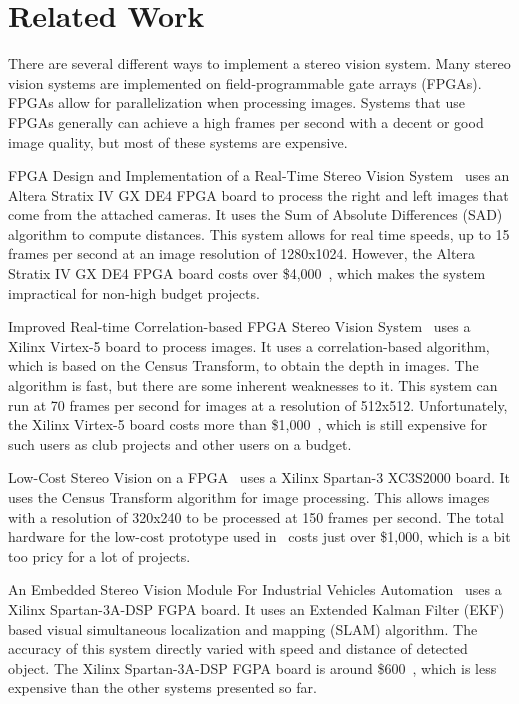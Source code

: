 \chapter{Related Work}

There are several different ways to implement a stereo vision system. Many stereo vision systems are implemented on field-programmable gate arrays (FPGAs). FPGAs allow for parallelization when processing images. Systems that use FPGAs generally can achieve a high frames per second with a decent or good image quality, but most of these systems are expensive. 

FPGA Design and Implementation of a Real-Time Stereo Vision System~\cite{alteraStratixIVPaper} uses an Altera Stratix IV GX DE4 FPGA board to process the right and left images that come from the attached cameras. It uses the Sum of Absolute Differences (SAD) algorithm to compute distances. This system allows for real time speeds, up to 15 frames per second at an image resolution of 1280x1024. However, the Altera Stratix IV GX DE4 FPGA board costs over \$4,000~\cite{alteraStratixIVBoard}, which makes the system impractical for non-high budget projects.

Improved Real-time Correlation-based FPGA Stereo Vision System~\cite{xilinxVirtex5Paper} uses a Xilinx Virtex-5 board to process images. It uses a correlation-based algorithm, which is based on the Census Transform, to obtain the depth in images. The algorithm is fast, but there are some inherent weaknesses to it. This system can run at 70 frames per second for images at a resolution of 512x512. Unfortunately, the Xilinx Virtex-5 board costs more than \$1,000~\cite{xilinxVirtex5Board}, which is still expensive for such users as club projects and other users on a budget.

Low-Cost Stereo Vision on a FPGA~\cite{lowCost1000} uses a Xilinx Spartan-3 XC3S2000 board. It uses the Census Transform algorithm for image processing. This allows images with a resolution of 320x240 to be processed at 150 frames per second. The total hardware for the low-cost prototype used in~\cite{lowCost1000} costs just over \$1,000, which is a bit too pricy for a lot of projects.

An Embedded Stereo Vision Module For Industrial Vehicles Automation~\cite{xilinxSpartan3APaper} uses a Xilinx Spartan-3A-DSP FGPA board. It uses an Extended Kalman Filter (EKF) based visual simultaneous localization and mapping (SLAM) algorithm. The accuracy of this system directly varied with speed and distance of detected object. The Xilinx Spartan-3A-DSP FGPA board is around \$600~\cite{xilinxSpartan3ABoard}, which is less expensive than the other systems presented so far.

